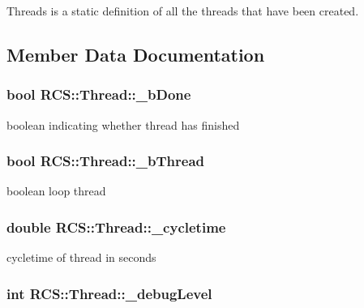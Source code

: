 Threads is a static definition of all the threads that have been created. 



\subsection{Member Data Documentation}
\hypertarget{classRCS_1_1Thread_acae3e9901f7de3fadd89fa67a30fabdf}{
\subsubsection[{\-\_\-b\-Done}]{\setlength{\rightskip}{0pt plus 5cm}bool R\-C\-S\-::\-Thread\-::\-\_\-b\-Done\hspace{0.3cm}{\ttfamily [protected]}}}\label{classRCS_1_1Thread_acae3e9901f7de3fadd89fa67a30fabdf}
boolean indicating whether thread has finished \hypertarget{classRCS_1_1Thread_acf46e3695b682bf24b8c80d0316edd82}{
\subsubsection[{\-\_\-b\-Thread}]{\setlength{\rightskip}{0pt plus 5cm}bool R\-C\-S\-::\-Thread\-::\-\_\-b\-Thread\hspace{0.3cm}{\ttfamily [protected]}}}\label{classRCS_1_1Thread_acf46e3695b682bf24b8c80d0316edd82}
boolean loop thread \hypertarget{classRCS_1_1Thread_ae0fa1f2cd2d13eaad9ecb2c649cb6158}{
\subsubsection[{\-\_\-cycletime}]{\setlength{\rightskip}{0pt plus 5cm}double R\-C\-S\-::\-Thread\-::\-\_\-cycletime\hspace{0.3cm}{\ttfamily [protected]}}}\label{classRCS_1_1Thread_ae0fa1f2cd2d13eaad9ecb2c649cb6158}
cycletime of thread in seconds \hypertarget{classRCS_1_1Thread_a33e768da1acf4a1deec407edeb656dc2}{
\subsubsection[{\-\_\-debug\-Level}]{\setlength{\rightskip}{0pt plus 5cm}int R\-C\-S\-::\-Thread\-::\-\_\-debug\-Level\hspace{0.3cm}{\ttfamily [protected]}}}\label{classRCS_1_1Thread_a33e768da1acf4a1deec407edeb656dc2}
